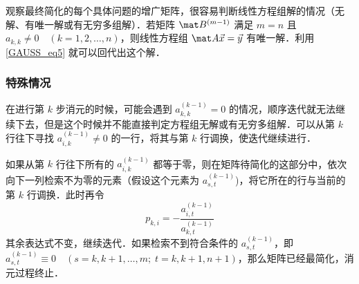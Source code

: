 观察最终简化的每个具体问题的增广矩阵，很容易判断线性方程组解的情况（无解、有唯一解或有无穷多组解）．若矩阵 $\mat B^{(m-1)}$ 满足 $m=n$ 且 $a_{k,k}\neq 0 \quad (k=1,2,\dots,n)$，则线性方程组 $\mat A \vec x = \vec y$ 有唯一解．利用\autoref{GAUSS_eq5} 就可以回代出这个解．

\subsubsection{特殊情况}
在进行第 $k$ 步消元的时候，可能会遇到 $a_{k,k}^{(k-1)}=0$ 的情况，顺序迭代就无法继续下去，但是这个时候并不能直接判定方程组无解或有无穷多组解．可以从第 $k$ 行往下寻找 $a_{i,k}^{(k-1)} \neq 0$ 的一行，将其与第 $k$ 行调换，使迭代继续进行．

如果从第 $k$ 行往下所有的 $a_{i,k}^{(k-1)}$ 都等于零，则在矩阵待简化的这部分中，依次向下一列检索不为零的元素（假设这个元素为 $a_{s,t}^{(k-1)}$)，将它所在的行与当前的第 $k$ 行调换．此时再令
\begin{equation}
p_{k,i} = - \frac{a_{i,t}^{(k-1)}}{a_{k,t}^{(k-1)}}
\end{equation}
其余表达式不变，继续迭代．如果检索不到符合条件的 $a_{s,t}^{(k-1)}$，即 $a_{s,t}^{(k-1)} \equiv 0 \quad(s=k,k+1,\dots,m;\;t=k,k+1,n+1)$，那么矩阵已经最简化，消元过程终止．

